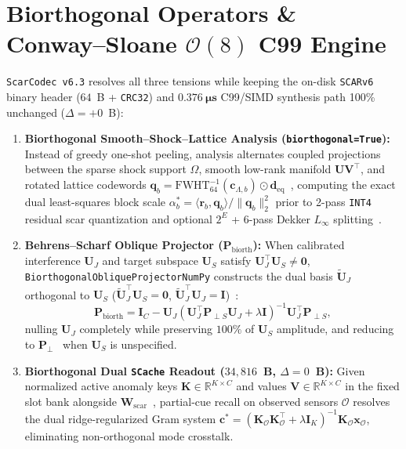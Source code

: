 \documentclass[10pt,twocolumn]{article}
\begin{document}
\section{Biorthogonal Operators \& Conway--Sloane $\mathcal{O}(8)$ C99 Engine}
\texttt{ScarCodec v6.3} resolves all three tensions while keeping the on-disk \texttt{SCARv6} binary header ($64$~B + \texttt{CRC32}) and $\mathbf{0.376~\mu\textbf{s}}$ C99/SIMD synthesis path 100\% unchanged ($\Delta=+0$~B):
\begin{enumerate}
    \item \textbf{Biorthogonal Smooth--Shock--Lattice Analysis (\texttt{biorthogonal=True}):} Instead of greedy one-shot peeling, analysis alternates coupled projections between the sparse shock support $\Omega$, smooth low-rank manifold $\mathbf{U}\mathbf{V}^\top$, and rotated lattice codewords $\mathbf{q}_b = \mathrm{FWHT}_{64}^{-1}(\mathbf{c}_{\Lambda,b})\odot \mathbf{d}_{\text{eq}}$~\citep{walsh1923closed,conway1982fast,viazovska2017sphere}, computing the exact dual least-squares block scale $\alpha_b^* = \langle \mathbf{r}_b, \mathbf{q}_b\rangle / \|\mathbf{q}_b\|_2^2$ prior to 2-pass \texttt{INT4} residual scar quantization and optional $2^E$ + $6$-pass Dekker $L_\infty$ splitting~\citep{dekker1971floating}.
    \item \textbf{Behrens--Scharf Oblique Projector ($\mathbf{P}_{\text{biorth}}$):} When calibrated interference $\mathbf{U}_J$ and target subspace $\mathbf{U}_S$ satisfy $\mathbf{U}_J^\top \mathbf{U}_S \neq \mathbf{0}$, \texttt{BiorthogonalObliqueProjectorNumPy} constructs the dual basis $\widetilde{\mathbf{U}}_J$ orthogonal to $\mathbf{U}_S$ ($\widetilde{\mathbf{U}}_J^\top \mathbf{U}_S = \mathbf{0}$, $\widetilde{\mathbf{U}}_J^\top \mathbf{U}_J = \mathbf{I}$)~\citep{behrens1994signal}:
    \begin{equation}
        \mathbf{P}_{\text{biorth}} = \mathbf{I}_C - \mathbf{U}_J (\mathbf{U}_J^\top \mathbf{P}_{\perp S} \mathbf{U}_J + \lambda\mathbf{I})^{-1} \mathbf{U}_J^\top \mathbf{P}_{\perp S}, \label{eq:pbiorth}
    \end{equation}
    nulling $\mathbf{U}_J$ completely while preserving $100\%$ of $\mathbf{U}_S$ amplitude, and reducing to $\mathbf{P}_\perp$~\citep{leshem2000multichannel} when $\mathbf{U}_S$ is unspecified.
    \item \textbf{Biorthogonal Dual \texttt{SCache} Readout ($34{,}816$~B, $\Delta=0$~B):} Given normalized active anomaly keys $\mathbf{K} \in \mathbb{R}^{K\times C}$ and values $\mathbf{V} \in \mathbb{R}^{K\times C}$ in the fixed slot bank alongside $\mathbf{W}_{\text{scar}}$~\citep{widrow1960adaptive}, partial-cue recall on observed sensors $\mathcal{O}$ resolves the dual ridge-regularized Gram system $\mathbf{c}^* = (\mathbf{K}_{\mathcal{O}} \mathbf{K}_{\mathcal{O}}^\top + \lambda \mathbf{I}_K)^{-1} \mathbf{K}_{\mathcal{O}} \mathbf{x}_{\mathcal{O}}$, eliminating non-orthogonal mode crosstalk.

\end{enumerate}
\end{document}
